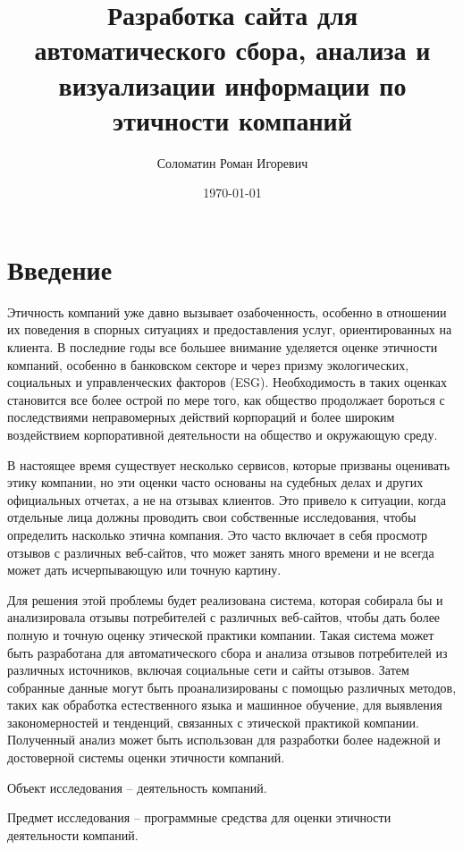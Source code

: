 \documentclass[PI, VKR]{HSEUniversity}
\author{Соломатин Роман Игоревич}
\date{\today}
\title{Разработка сайта для автоматического сбора, анализа и визуализации информации по этичности компаний}
\begin{document}
\maketitle

\chapter*{Введение}
\label{sec:org79e69d8}
Этичность компаний уже давно вызывает озабоченность, особенно в отношении их поведения в спорных ситуациях и предоставления услуг, ориентированных на клиента. В последние годы все большее внимание уделяется оценке этичности компаний\autocites[]{mure_esg_2021}[][]{miralles-quiros_esg_2019}[][]{climent_ethical_2018}, особенно в банковском секторе и через призму экологических, социальных и управленческих факторов (ESG). Необходимость в таких оценках становится все более острой по мере того, как общество продолжает бороться с последствиями неправомерных действий корпораций и более широким воздействием корпоративной деятельности на общество и окружающую среду.

В настоящее время существует несколько сервисов, которые призваны оценивать этику компании, но эти оценки часто основаны на судебных делах и других официальных отчетах, а не на отзывах клиентов. Это привело к ситуации, когда отдельные лица должны проводить свои собственные исследования, чтобы определить насколько этична компания. Это часто включает в себя просмотр отзывов с различных веб-сайтов, что может занять много времени и не всегда может дать исчерпывающую или точную картину.

Для решения этой проблемы будет реализована система, которая собирала бы и анализировала отзывы потребителей с различных веб-сайтов, чтобы дать более полную и точную оценку этической практики компании. Такая система может быть разработана для автоматического сбора и анализа отзывов потребителей из различных источников, включая социальные сети и сайты отзывов. Затем собранные данные могут быть проанализированы с помощью различных методов, таких как обработка естественного языка и машинное обучение, для выявления закономерностей и тенденций, связанных с этической практикой компании. Полученный анализ может быть использован для разработки более надежной и достоверной системы оценки этичности компаний.

Объект исследования – деятельность компаний.

Предмет исследования – программные средства для оценки этичности деятельности компаний.
\end{document}
